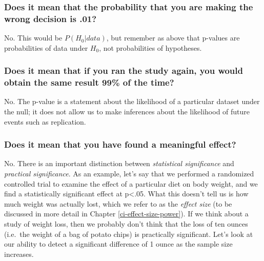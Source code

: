 \documentclass[]{book}
\theoremstyle{definition}
\theoremstyle{definition}
\theoremstyle{definition}
\theoremstyle{remark}
\begin{document}
\subsubsection{Does it mean that the probability that you are making the
wrong decision is
.01?}\label{does-it-mean-that-the-probability-that-you-are-making-the-wrong-decision-is-.01}

No. This would be \(P(H_0|data)\), but remember as above that p-values
are probabilities of data under \(H_0\), not probabilities of
hypotheses.

\subsubsection{Does it mean that if you ran the study again, you would
obtain the same result 99\% of the
time?}\label{does-it-mean-that-if-you-ran-the-study-again-you-would-obtain-the-same-result-99-of-the-time}

No. The p-value is a statement about the likelihood of a particular
dataset under the null; it does not allow us to make inferences about
the likelihood of future events such as replication.

\subsubsection{Does it mean that you have found a meaningful
effect?}\label{does-it-mean-that-you-have-found-a-meaningful-effect}

No. There is an important distinction between \emph{statistical
significance} and \emph{practical significance}. As an example, let's
say that we performed a randomized controlled trial to examine the
effect of a particular diet on body weight, and we find a statistically
significant effect at p\textless{}.05. What this doesn't tell us is how
much weight was actually lost, which we refer to as the \emph{effect
size} (to be discussed in more detail in Chapter
\ref{ci-effect-size-power}). If we think about a study of weight loss,
then we probably don't think that the loss of ten ounces (i.e.~the
weight of a bag of potato chips) is practically significant. Let's look
at our ability to detect a significant difference of 1 ounce as the
sample size increases.
\end{document}
